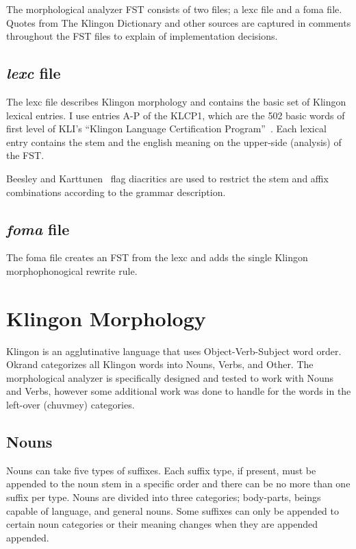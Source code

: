 \documentclass[11pt]{article}
\begin{document}
The morphological analyzer FST consists of two files; a lexc file and a foma file. Quotes from The Klingon Dictionary and other sources are captured in comments throughout the FST files to explain of implementation decisions.

\subsection{\textit{lexc} file}

The lexc file describes Klingon morphology and contains the basic set of Klingon lexical entries. I use entries A-P of the KLCP1, which are the 502 basic words of first level of KLI's ``Klingon Language Certification Program''~\cite{Zrajm:12}. Each lexical entry contains the stem and the english meaning on the upper-side (analysis) of the FST.

Beesley and Karttunen~ flag diacritics are used to restrict the stem and affix combinations according to the grammar description.

\subsection{\textit{foma} file}

The foma file creates an FST from the lexc and adds the single Klingon morphophonogical rewrite rule.

\section{Klingon Morphology}

Klingon is an agglutinative language that uses Object-Verb-Subject word order. Okrand categorizes all Klingon words into Nouns, Verbs, and Other. The morphological analyzer is specifically designed and tested to work with Nouns and Verbs, however some additional work was done to handle for the words in the left-over (chuvmey) categories.

\subsection {Nouns}

Nouns can take five types of suffixes. Each suffix type, if present, must be appended to the noun stem in a specific order and there can be no more than one suffix per type. Nouns are divided into three categories; body-parts, beings capable of language, and general nouns. Some suffixes can only be appended to certain noun categories or their meaning changes when they are appended appended.
\end{document}
